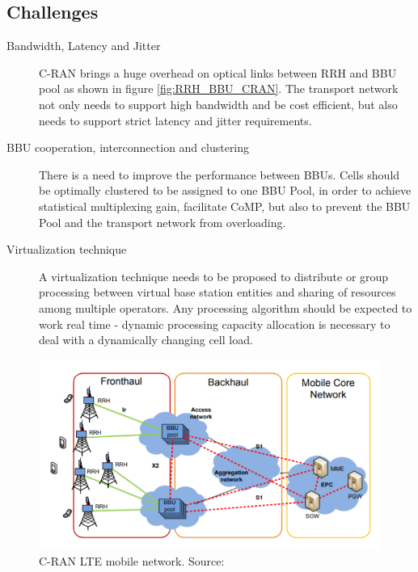 \documentclass{article}
\begin{document}

\subsection{Challenges}\nocite{checko14}

\begin{description}
    
    \item [Bandwidth, Latency and Jitter] C-RAN brings a huge
    overhead on optical links between RRH and BBU pool as shown
    in figure \ref{fig:RRH_BBU_CRAN}.
    The transport network not only needs to support high bandwidth 
    and be cost efficient, but also needs to support strict latency 
    and jitter requirements.
    
    \item [BBU cooperation, interconnection and clustering] 
    There is a need to improve the performance between BBUs. 
    Cells should be optimally clustered to be assigned to one
    BBU Pool, in order to achieve statistical multiplexing gain,
    facilitate CoMP, but also to prevent the BBU Pool and the
    transport network from overloading. 
    
    \item [Virtualization technique] A virtualization technique
    needs to be proposed to distribute or group processing between
    virtual base station entities and sharing of resources among 
    multiple operators. Any processing algorithm should be 
    expected to work real time - dynamic processing capacity 
    allocation is necessary to deal with a dynamically changing
    cell load.
    
\end{description}



\begin{figure}
  \includegraphics[scale=0.7]{res/LTE_CRAN.PNG}
    \caption{C-RAN LTE mobile network. Source: \parencite{checko14}}
  \label{fig:LTE_CRAN}
\end{figure}
\end{document}

